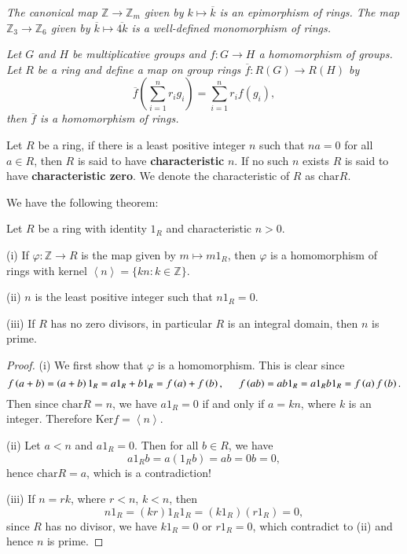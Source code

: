 \begin{example}\em
The canonical map $\mathbb{Z}\to\mathbb{Z}_m$ given by $k\mapsto\overline{k}$ is an epimorphism of rings. The map $\mathbb{Z}_3\to\mathbb{Z}_6$ given by $\overline{k}\mapsto\overline{4k}$ is a well-defined monomorphism of rings.
\end{example}
\begin{example}\em
Let $G$ and $H$ be multiplicative groups and $f:G\to H$ a homomorphism of groups. Let $R$ be a ring and define a map on group rings $\overline{f}:R(G)\to R(H)$ by 
$$\overline{f}\left(\sum_{i=1}^nr_ig_i\right)=\sum_{i=1}^nr_if(g_i),$$
then $\overline{f}$ is a homomorphism of rings.
\end{example}
\begin{definition}
Let $R$ be a ring, if there is a least positive integer $n$ such that $na=0$ for all $a\in R$, then $R$ is said to have \textbf{characteristic} $n$. If no such $n$ exists $R$ is said to have \textbf{characteristic zero}. We denote the characteristic of $R$ as $\mathrm{char}R$.
\end{definition}
We have the following theorem:
\begin{theorem}
Let $R$ be a ring with identity $1_R$ and characteristic $n>0$.\par
(i) If $\varphi:\mathbb{Z}\to R$ is the map given by $m\mapsto m1_R$, then $\varphi$ is a homomorphism of rings with kernel $\left<n\right>=\{kn:k\in\mathbb{Z}\}$.\par
(ii) $n$ is the least positive integer such that $n1_R=0$.\par
(iii) If $R$ has no zero divisors, in particular $R$ is an integral domain, then $n$ is prime.
\end{theorem}
\begin{proof}
(i) We first show that $\varphi$ is a homomorphism. This is clear since 
$$
f\left( a+b \right) =\left( a+b \right) 1_R=a1_R+b1_R=f\left( a \right) +f\left( b \right) ,\hspace{0.5cm}f\left( ab \right) =ab1_R=a1_Rb1_R=f\left( a \right) f\left( b \right) .
$$
Then since $\mathrm{char}R=n$, we have $a1_R=0$ if and only if $a=kn$, where $k$ is an integer. Therefore $\mathrm{Ker}f=\left<n\right>$.\par
(ii) Let $a<n$ and $a1_R=0$. Then for all $b\in R$, we have 
$$
a1_Rb=a\left( 1_Rb \right) =ab=0b=0,
$$
hence $\mathrm{char}R=a$, which is a contradiction!\par
(iii) If $n=rk$, where $r<n$, $k<n$, then 
$$
n1_R=\left( kr \right) 1_R1_R=\left( k1_R \right) \left( r1_R \right) =0,
$$
since $R$ has no divisor, we have $k1_R=0$ or $r1_R=0$, which contradict to (ii) and hence $n$ is prime.
\end{proof}
